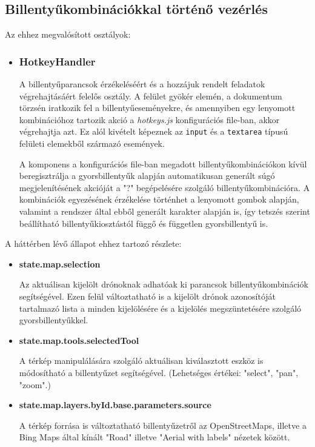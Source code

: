 \subsection{Billentyűkombinációkkal történő vezérlés}

\noindent Az ehhez megvalósított osztályok:
\begin{itemize}

\item\subsubsection{HotkeyHandler}

A billentyűparancsok érzékeléséért és a hozzájuk rendelt feladatok
végrehajtásáért felelős osztály. A felület gyökér elemén, a dokumentum törzsén
iratkozik fel a billentyűeseményekre, és amennyiben egy lenyomott kombinációhoz
tartozik akció a \textit{hotkeys.js} konfigurációs file-ban, akkor végrehajtja
azt. Ez alól kivételt képeznek az \verb|input| és a \verb|textarea| típusú
felületi elemekből származó események.

A komponens a konfigurációs file-ban megadott billentyűkombinációkon kívül
beregisztrálja a gyorsbillentyűk alapján automatikusan generált súgó
megjelenítésének akcióját a "?" begépelésére szolgáló billentyűkombinációra.
A kombinációk egyezésének érzékelése történhet a lenyomott gombok alapján,
valamint a rendszer által ebből generált karakter alapján is, így tetszés
szerint beállítható billentyűkiosztástól függő és független gyorsbillentyű is.

\end{itemize}
\noindent A háttérben lévő állapot ehhez tartozó részlete:
\begin{itemize}

  \item \textbf{state.map.selection}

  Az aktuálisan kijelölt drónoknak adhatóak ki parancsok billentyűkombinációk
  segítségével. Ezen felül változtatható is a kijelölt drónok azonosítóját
  tartalmazó lista a minden kijelölésére és a kijelölés megszüntetésére szolgáló
  gyorsbillentyűkkel.

  \item \textbf{state.map.tools.selectedTool}

  A térkép manipulálására szolgáló aktuálisan kiválasztott eszköz is módosítható
  a billentyűzet segítségével. (Lehetséges értékei: "select", "pan", "zoom".)

  \item \textbf{state.map.layers.byId.base.parameters.source}

  A térkép forrása is változtatható billentyűzetről az OpenStreetMaps, illetve a
  Bing Maps által kínált "Road" illetve "Aerial with labels" nézetek között.

\end{itemize}

